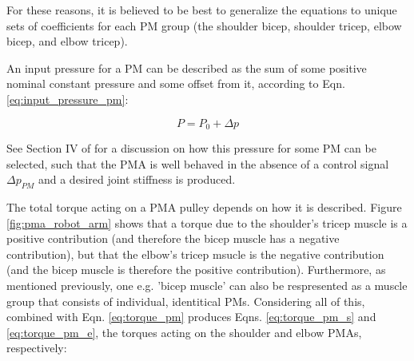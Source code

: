 \documentclass[conference]{IEEEtran}
\begin{document}
	For these reasons, it is believed to be best to generalize the equations to unique sets of coefficients for each \ac{PM} group (the shoulder bicep, shoulder tricep, elbow bicep, and elbow tricep).

	An input pressure for a \ac{PM} can be described as the sum of some positive nominal constant pressure and some offset from it, according to Eqn. \eqref{eq:input_pressure_pm}:
	
	\begin{equation}\label{eq:input_pressure_pm}
		P = P_{0} + \Delta p
	\end{equation}

	See Section IV of \cite{main-article} for a discussion on how this pressure for some \ac{PM} can be selected, such that the \ac{PMA} is well behaved in the absence of a control signal $\Delta p_{PM}$ and a desired joint stiffness is produced.

	The total torque acting on a \ac{PMA} pulley depends on how it is described. Figure \ref{fig:pma_robot_arm} shows that a torque due to the shoulder's tricep muscle is a positive contribution (and therefore the bicep muscle has a negative contribution), but that the elbow's tricep msucle is the negative contribution (and the bicep muscle is therefore the positive contribution). Furthermore, as mentioned previously, one e.g. 'bicep muscle' can also be respresented as a muscle group that consists of individual, identitical \acp{PM}. Considering all of this, combined with Eqn. \eqref{eq:torque_pm} produces Eqns. \eqref{eq:torque_pm_s} and \eqref{eq:torque_pm_e}, the torques acting on the shoulder and elbow \acp{PMA}, respectively:
	
\end{document}
